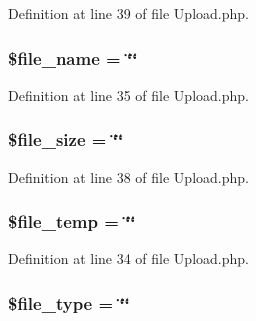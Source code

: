 Definition at line 39 of file Upload.\-php.

\hypertarget{class_c_i___upload_a59bf132c77b5bee5adff2098cc2a6fbc}{
\subsubsection[{\$file\-\_\-name}]{\setlength{\rightskip}{0pt plus 5cm}\$file\-\_\-name = \char`\"{}\char`\"{}}}\label{class_c_i___upload_a59bf132c77b5bee5adff2098cc2a6fbc}


Definition at line 35 of file Upload.\-php.

\hypertarget{class_c_i___upload_a5b3595a69dbf686d879bd009ec9c0317}{
\subsubsection[{\$file\-\_\-size}]{\setlength{\rightskip}{0pt plus 5cm}\$file\-\_\-size = \char`\"{}\char`\"{}}}\label{class_c_i___upload_a5b3595a69dbf686d879bd009ec9c0317}


Definition at line 38 of file Upload.\-php.

\hypertarget{class_c_i___upload_a8b49917820e40f0b8956d95c1fd6ee6e}{
\subsubsection[{\$file\-\_\-temp}]{\setlength{\rightskip}{0pt plus 5cm}\$file\-\_\-temp = \char`\"{}\char`\"{}}}\label{class_c_i___upload_a8b49917820e40f0b8956d95c1fd6ee6e}


Definition at line 34 of file Upload.\-php.

\hypertarget{class_c_i___upload_a6210dfa92a7e2e5e9db1aa2337ce4cd1}{
\subsubsection[{\$file\-\_\-type}]{\setlength{\rightskip}{0pt plus 5cm}\$file\-\_\-type = \char`\"{}\char`\"{}}}\label{class_c_i___upload_a6210dfa92a7e2e5e9db1aa2337ce4cd1}


